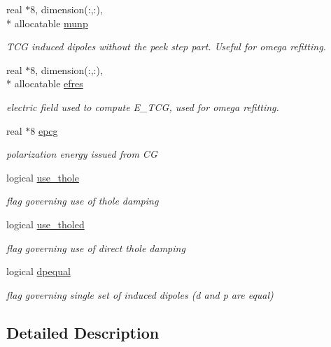 \begin{DoxyCompactItemize}
real $\ast$8, dimension(\-:,\-:), \\*
allocatable \hyperlink{classpolpot_a0d42cffaacfef58c15d8404101cf8112}{munp}
\begin{DoxyCompactList}\small\item\em T\-C\-G induced dipoles without the peek step part. Useful for omega refitting. \end{DoxyCompactList}\item 
real $\ast$8, dimension(\-:,\-:), \\*
allocatable \hyperlink{classpolpot_a6f222d16444d165478dfb371302763a4}{efres}
\begin{DoxyCompactList}\small\item\em electric field used to compute E\-\_\-\-T\-C\-G, used for omega refitting. \end{DoxyCompactList}\item 
real $\ast$8 \hyperlink{classpolpot_a0038c68de694ddc7dbb7dc781aa2c845}{epcg}
\begin{DoxyCompactList}\small\item\em polarization energy issued from C\-G \end{DoxyCompactList}\item 
logical \hyperlink{classpolpot_aa3cbfbce679dad4d09161d303fd3e4ab}{use\-\_\-thole}
\begin{DoxyCompactList}\small\item\em flag governing use of thole damping \end{DoxyCompactList}\item 
logical \hyperlink{classpolpot_ae13276c9ed18e0b57964b4d9dbb8280a}{use\-\_\-tholed}
\begin{DoxyCompactList}\small\item\em flag governing use of direct thole damping \end{DoxyCompactList}\item 
logical \hyperlink{classpolpot_a1798b6de41bb676fcde778df28be9810}{dpequal}
\begin{DoxyCompactList}\small\item\em flag governing single set of induced dipoles (d and p are equal) \end{DoxyCompactList}\end{DoxyCompactItemize}


\subsection{Detailed Description}


